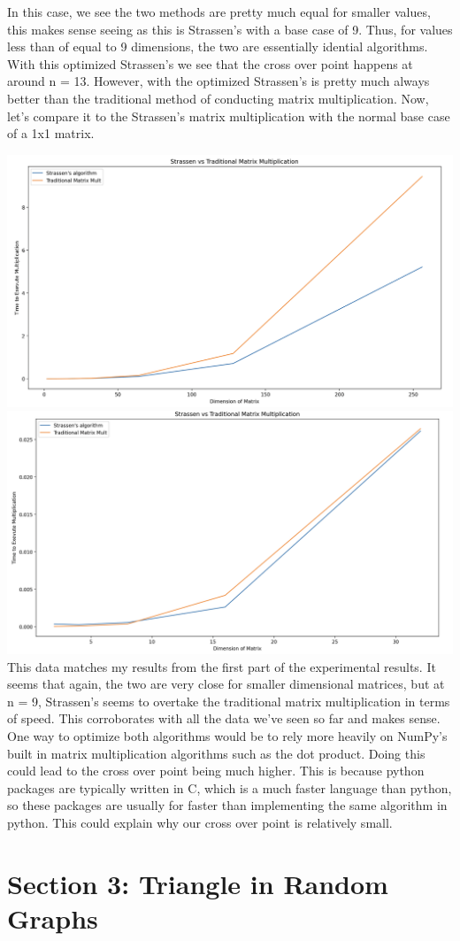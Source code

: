 \documentclass{article}
\begin{document}
In this case, we see the two methods are pretty much equal for smaller values, this makes sense seeing as this is Strassen's with a base case of 9. Thus, for values less than of equal to 9 dimensions, the two are essentially idential algorithms. With this optimized Strassen's we see that the cross over point happens at around n = 13. However, with the optimized Strassen's is pretty much always better than the traditional method of conducting matrix multiplication. Now, let's compare it to the Strassen's matrix multiplication with the normal base case of a 1x1 matrix.

\includegraphics[width=\textwidth]{graph4.png}
\includegraphics[width=\textwidth]{graph5.png} \\

This data matches my results from the first part of the experimental results. It seems that again, the two are very close for smaller dimensional matrices, but at n = 9, Strassen's seems to overtake the traditional matrix multiplication in terms of speed. This corroborates with all the data we've seen so far and makes sense. One way to optimize both algorithms would be to rely more heavily on NumPy's built in matrix multiplication algorithms such as the dot product. Doing this could lead to the cross over point being much higher. This is because python packages are typically written in C, which is a much faster language than python, so these packages are usually for faster than implementing the same algorithm in python. This could explain why our cross over point is relatively small.

\section{Section 3: Triangle in Random Graphs}
\end{document}
